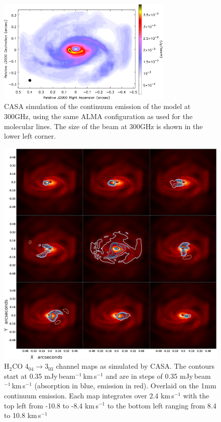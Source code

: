 \documentclass[useAMS,usenatbib]{mn2e}
\begin{document}
\begin{figure}
 \includegraphics[width=84mm]{Figures/sim/casa_cont_300GHz_invert2.eps}

 \caption{CASA simulation of the continuum emission of the model at 300GHz, using the same ALMA configuration as used for the molecular lines. The size of the beam at 300GHz is shown in the lower left corner.}
 \label{continuum}
\end{figure}

\begin{figure}
 \includegraphics[width=168mm]{Figures/sim/channel_map-2.eps} 
 \caption{H$_2$CO 4$_{04}\rightarrow$3$_{03}$ channel maps as simulated by CASA. The contours start at 0.35 mJy$\,$beam$^{-1}\,$km$\,$s$^{-1}$  and are in steps of 0.35 mJy$\,$beam$^{-1}\,$km$\,$s$^{-1}$ (absorption in blue, emission in red). Overlaid on the 1mm continuum emission. Each map integrates over 2.4 km$\,$s$^{-1}$ with the top left from -10.8 to -8.4 km$\,$s$^{-1}$ to the bottom left ranging from 8.4 to 10.8 km$\,$s$^{-1}$}
 \label{h2co_chanmap}
\end{figure}
\end{document}
